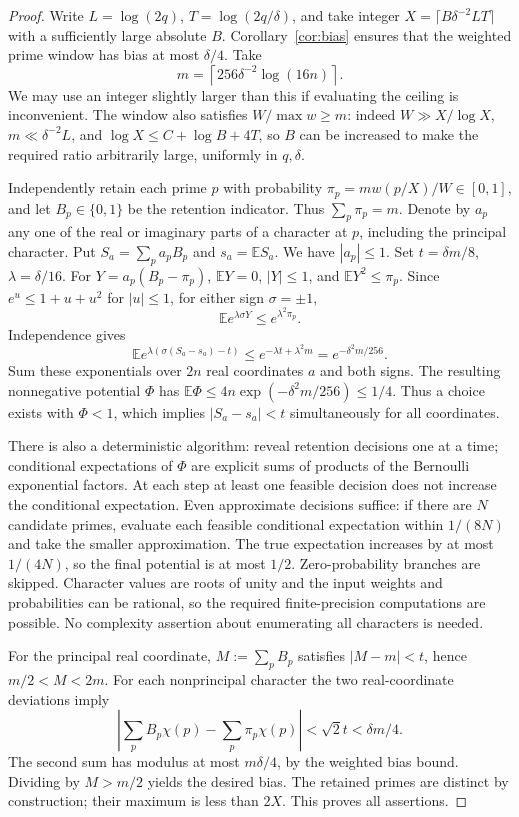 \documentclass[11pt]{article}
\theoremstyle{remark}\newtheorem{remark}[theorem]{Remark}
\newcommand{\E}{\mathbb E}
\begin{document}
\begin{proof}
Write $L=\log(2q)$, $T=\log(2q/\delta)$, and take integer $X=\lceil B\delta^{-2}LT\rceil$ with a sufficiently large absolute $B$. Corollary~\ref{cor:bias} ensures that the weighted prime window has bias at most $\delta/4$. Take
\[
 m=\left\lceil256\delta^{-2}\log(16n)\right\rceil.
\]
We may use an integer slightly larger than this if evaluating the ceiling is inconvenient. The window also satisfies $W/\max w\ge m$: indeed $W\gg X/\log X$, $m\ll\delta^{-2}L$, and $\log X\le C+\log B+4T$, so $B$ can be increased to make the required ratio arbitrarily large, uniformly in $q,\delta$.

Independently retain each prime $p$ with probability $\pi_p=mw(p/X)/W\in[0,1]$, and let $B_p\in\{0,1\}$ be the retention indicator. Thus $\sum_p\pi_p=m$. Denote by $a_p$ any one of the real or imaginary parts of a character at $p$, including the principal character. Put $S_a=\sum_pa_pB_p$ and $s_a=\E S_a$. We have $|a_p|\le1$. Set $t=\delta m/8$, $\lambda=\delta/16$. For $Y=a_p(B_p-\pi_p)$, $\E Y=0$, $|Y|\le1$, and $\E Y^2\le\pi_p$. Since $e^u\le1+u+u^2$ for $|u|\le1$, for either sign $\sigma=\pm1$,
\[
 \E e^{\lambda\sigma Y}\le e^{\lambda^2\pi_p}.
\]
Independence gives
\[
 \E e^{\lambda(\sigma(S_a-s_a)-t)}
 \le e^{-\lambda t+\lambda^2m}=e^{-\delta^2m/256}.
\]
Sum these exponentials over $2n$ real coordinates $a$ and both signs. The resulting nonnegative potential $\Phi$ has $\E\Phi\le4n\exp(-\delta^2m/256)\le1/4$. Thus a choice exists with $\Phi<1$, which implies $|S_a-s_a|<t$ simultaneously for all coordinates.

There is also a deterministic algorithm: reveal retention decisions one at a time; conditional expectations of $\Phi$ are explicit sums of products of the Bernoulli exponential factors. At each step at least one feasible decision does not increase the conditional expectation. Even approximate decisions suffice: if there are $N$ candidate primes, evaluate each feasible conditional expectation within $1/(8N)$ and take the smaller approximation. The true expectation increases by at most $1/(4N)$, so the final potential is at most $1/2$. Zero-probability branches are skipped. Character values are roots of unity and the input weights and probabilities can be rational, so the required finite-precision computations are possible. No complexity assertion about enumerating all characters is needed.

For the principal real coordinate, $M:=\sum_pB_p$ satisfies $|M-m|<t$, hence $m/2<M<2m$. For each nonprincipal character the two real-coordinate deviations imply
\[
 \left|\sum_pB_p\chi(p)-\sum_p\pi_p\chi(p)\right|
 <\sqrt2t<\delta m/4.
\]
The second sum has modulus at most $m\delta/4$, by the weighted bias bound. Dividing by $M>m/2$ yields the desired bias. The retained primes are distinct by construction; their maximum is less than $2X$. This proves all assertions.
\end{proof}
\end{document}
